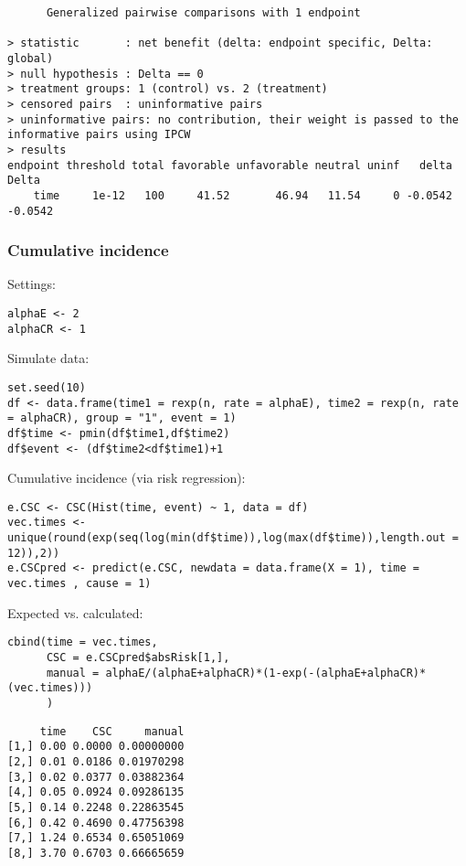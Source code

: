 \documentclass[12pt]{article}
\begin{document}
\begin{verbatim}
      Generalized pairwise comparisons with 1 endpoint

> statistic       : net benefit (delta: endpoint specific, Delta: global) 
> null hypothesis : Delta == 0 
> treatment groups: 1 (control) vs. 2 (treatment) 
> censored pairs  : uninformative pairs
> uninformative pairs: no contribution, their weight is passed to the informative pairs using IPCW
> results
endpoint threshold total favorable unfavorable neutral uninf   delta   Delta
    time     1e-12   100     41.52       46.94   11.54     0 -0.0542 -0.0542
\end{verbatim}

\subsubsection{Cumulative incidence}
\label{sec:org81a97fd}

Settings:
\lstset{language=r,label= ,caption= ,captionpos=b,numbers=none}
\begin{lstlisting}
alphaE <- 2
alphaCR <- 1
\end{lstlisting}

Simulate data:
\lstset{language=r,label= ,caption= ,captionpos=b,numbers=none}
\begin{lstlisting}
set.seed(10)
df <- data.frame(time1 = rexp(n, rate = alphaE), time2 = rexp(n, rate = alphaCR), group = "1", event = 1)
df$time <- pmin(df$time1,df$time2)
df$event <- (df$time2<df$time1)+1
\end{lstlisting}

Cumulative incidence (via risk regression):
\lstset{language=r,label= ,caption= ,captionpos=b,numbers=none}
\begin{lstlisting}
e.CSC <- CSC(Hist(time, event) ~ 1, data = df)
vec.times <- unique(round(exp(seq(log(min(df$time)),log(max(df$time)),length.out = 12)),2))
e.CSCpred <- predict(e.CSC, newdata = data.frame(X = 1), time = vec.times , cause = 1)
\end{lstlisting}

Expected vs. calculated:
\lstset{language=r,label= ,caption= ,captionpos=b,numbers=none}
\begin{lstlisting}
cbind(time = vec.times,
	  CSC = e.CSCpred$absRisk[1,],
	  manual = alphaE/(alphaE+alphaCR)*(1-exp(-(alphaE+alphaCR)*(vec.times)))
	  )
\end{lstlisting}

\begin{verbatim}
     time    CSC     manual
[1,] 0.00 0.0000 0.00000000
[2,] 0.01 0.0186 0.01970298
[3,] 0.02 0.0377 0.03882364
[4,] 0.05 0.0924 0.09286135
[5,] 0.14 0.2248 0.22863545
[6,] 0.42 0.4690 0.47756398
[7,] 1.24 0.6534 0.65051069
[8,] 3.70 0.6703 0.66665659
\end{verbatim}
\end{document}
